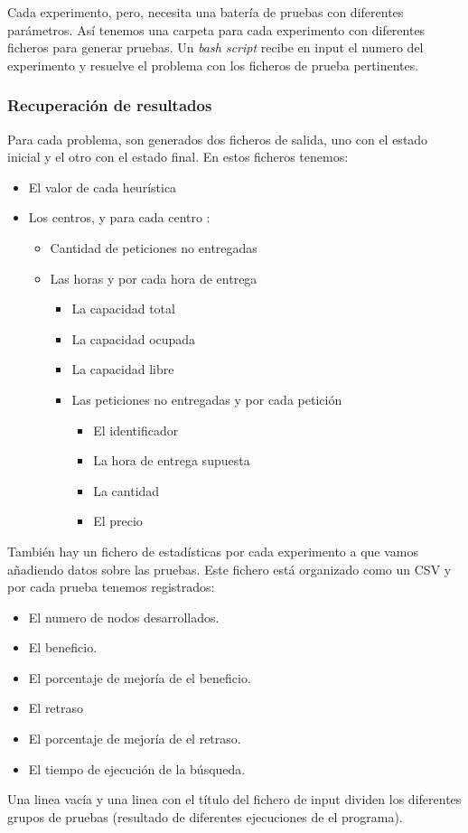 \documentclass{article}
\begin{document}
Cada experimento, pero, necesita una batería de pruebas con diferentes
parámetros. Así tenemos una carpeta para cada experimento con diferentes
ficheros para generar pruebas. Un {\it bash script} recibe en input el numero
del experimento y resuelve el problema con los ficheros de prueba pertinentes.

\subsubsection{Recuperación de resultados}

Para cada problema, son generados dos ficheros de salida, uno con el estado
inicial y el otro con el estado final. En estos ficheros tenemos:

\begin{itemize}
\item El valor de cada heurística
\item Los centros, y para cada centro :
	\begin{itemize}
		\item Cantidad de peticiones no entregadas
		\item Las horas y por cada hora de entrega
		\begin{itemize}		
			\item La capacidad total
			\item La capacidad ocupada
			\item La capacidad libre
			\item Las peticiones no entregadas y por cada petición		
			\begin{itemize}
			\item El identificador
			\item La hora de entrega supuesta
			\item La cantidad
			\item El precio
			\end{itemize}
		\end{itemize}
	\end{itemize}
\end{itemize}
También hay un fichero de estadísticas por cada experimento a que vamos
añadiendo datos sobre las pruebas. Este fichero está organizado como un CSV y
por cada prueba tenemos registrados:
\begin{itemize}
\item El numero de nodos desarrollados. 
\item El beneficio.
\item El porcentaje de mejoría de el beneficio.
\item El retraso
\item El porcentaje de mejoría de el retraso.
\item El tiempo de ejecución de la búsqueda.
\end{itemize}
Una linea vacía y una linea con el título del fichero de input dividen los diferentes grupos de pruebas (resultado de diferentes ejecuciones de el programa).
\end{document}
